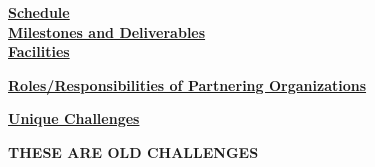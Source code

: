 

\vspace*{.05in}\noindent \underline{\textbf{Schedule}} \\[-2ex]


\vspace*{.05in}\noindent \underline{\textbf{Milestones and Deliverables}} \\[-2ex]


\vspace*{.05in}\noindent \underline{\textbf{Facilities}}



\vspace*{.05in}\noindent \underline{\textbf{Roles/Responsibilities of
Partnering Organizations}}




\vspace*{.05in}\noindent \underline{\textbf{Unique Challenges}}

\textbf{THESE ARE OLD CHALLENGES}

